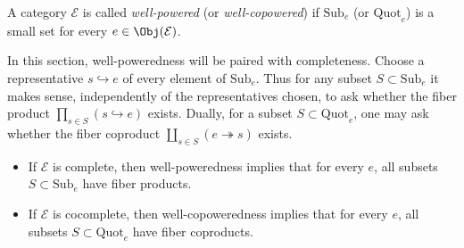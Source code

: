 \begin{definition}\label{def:well-powered}
	A category $\mathcal{E}$ is called \emph{well-powered} (or
	\emph{well-copowered}) if $\mathrm{Sub}_e$ (or $\mathrm{Quot}_e$) is a
	small set for every $e\in\Obj(\mathcal{E})$.
\end{definition}

In this section, well-poweredness will be paired with completeness. Choose a
representative $s\hookrightarrow e$ of every element of $\mathrm{Sub}_e$.
Thus for any subset $S\subset\mathrm{Sub}_e$ it makes sense, independently of
the representatives chosen, to ask whether the fiber product
$\prod_{s\in S}(s\hookrightarrow e)$ exists. Dually, for a subset
$S\subset\mathrm{Quot}_e$, one may ask whether the fiber coproduct
$\coprod_{s\in S}(e\twoheadrightarrow s)$ exists.
\begin{itemize}
	\item If $\mathcal{E}$ is complete, then well-poweredness implies that for
	every $e$, all subsets $S\subset\mathrm{Sub}_e$ have fiber products.
	\item If $\mathcal{E}$ is cocomplete, then well-copoweredness implies that
	for every $e$, all subsets $S\subset\mathrm{Quot}_e$ have fiber coproducts.
\end{itemize}

